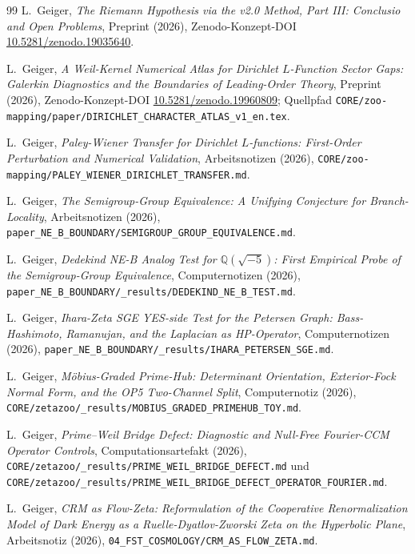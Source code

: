 \documentclass[11pt]{article}
\theoremstyle{definition}
\theoremstyle{remark}
\begin{document}
\begin{thebibliography}{99}
L.~Geiger, \emph{The Riemann Hypothesis via the v2.0 Method,
Part III: Conclusio and Open Problems}, Preprint (2026),
Zenodo-Konzept-DOI
\href{https://doi.org/10.5281/zenodo.19035640}{10.5281/zenodo.19035640}.

L.~Geiger, \emph{A Weil-Kernel Numerical Atlas for Dirichlet
$L$-Function Sector Gaps: Galerkin Diagnostics and the Boundaries of
Leading-Order Theory}, Preprint (2026), Zenodo-Konzept-DOI
\href{https://doi.org/10.5281/zenodo.19960809}{10.5281/zenodo.19960809};
Quellpfad \texttt{CORE/zoo-mapping/paper/DIRICHLET\_CHARACTER\_ATLAS\_v1\_en.tex}.

L.~Geiger, \emph{Paley-Wiener Transfer for Dirichlet $L$-functions:
First-Order Perturbation and Numerical Validation}, Arbeitsnotizen
(2026),
\texttt{CORE/zoo-mapping/PALEY\_WIENER\_DIRICHLET\_TRANSFER.md}.

L.~Geiger, \emph{The Semigroup-Group Equivalence: A Unifying
Conjecture for Branch-Locality}, Arbeitsnotizen (2026),
\texttt{paper\_NE\_B\_BOUNDARY/SEMIGROUP\_GROUP\_EQUIVALENCE.md}.

L.~Geiger, \emph{Dedekind NE-B Analog Test for
$\mathbb{Q}(\sqrt{-5})$: First Empirical Probe of the
Semigroup-Group Equivalence}, Computernotizen (2026),
\texttt{paper\_NE\_B\_BOUNDARY/\_results/DEDEKIND\_NE\_B\_TEST.md}.

L.~Geiger, \emph{Ihara-Zeta SGE YES-side Test for the Petersen
Graph: Bass-Hashimoto, Ramanujan, and the Laplacian as HP-Operator},
Computernotizen (2026),
\texttt{paper\_NE\_B\_BOUNDARY/\_results/IHARA\_PETERSEN\_SGE.md}.

L.~Geiger, \emph{Möbius-Graded Prime-Hub: Determinant Orientation,
Exterior-Fock Normal Form, and the OP5 Two-Channel Split}, Computernotiz
(2026),
\texttt{CORE/zetazoo/\_results/MOBIUS\_GRADED\_PRIMEHUB\_TOY.md}.

L.~Geiger, \emph{Prime--Weil Bridge Defect: Diagnostic and Null-Free
Fourier-CCM Operator Controls}, Computationsartefakt (2026),
\texttt{CORE/zetazoo/\_results/PRIME\_WEIL\_BRIDGE\_DEFECT.md} und
\texttt{CORE/zetazoo/\_results/PRIME\_WEIL\_BRIDGE\_DEFECT\_OPERATOR\_FOURIER.md}.

L.~Geiger, \emph{CRM as Flow-Zeta: Reformulation of the Cooperative
Renormalization Model of Dark Energy as a Ruelle-Dyatlov-Zworski
Zeta on the Hyperbolic Plane}, Arbeitsnotiz (2026),
\texttt{04\_FST\_COSMOLOGY/CRM\_AS\_FLOW\_ZETA.md}.


\end{thebibliography}
\end{document}
